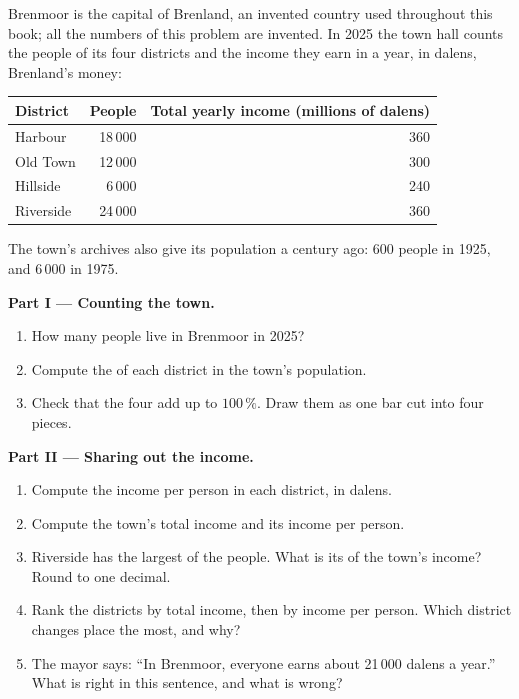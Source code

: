 \begin{problem}
\label{pb:g6:reading-economic-charts:1}
Brenmoor is the capital of Brenland, an invented country used throughout this
book; all the numbers of this problem are invented. In 2025 the town hall
counts the people of its four districts and the income they earn in a year,
in dalens, Brenland's money:

\begin{center}
\begin{tabular}{lrr}
\toprule
District & People & Total yearly income (millions of dalens) \\
\midrule
Harbour   & 18\,000 & 360 \\
Old Town  & 12\,000 & 300 \\
Hillside  &  6\,000 & 240 \\
Riverside & 24\,000 & 360 \\
\bottomrule
\end{tabular}
\end{center}

\noindent The town's archives also give its population a century ago: 600
people in 1925, and 6\,000 in 1975.

\medskip
\noindent\textbf{Part I --- Counting the town.}
\begin{enumerate}
  \item How many people live in Brenmoor in 2025?
  \item Compute the  of each district in the town's population.
  \item Check that the four  add up to $100\,\%$. Draw them as one bar
        cut into four pieces.
\end{enumerate}

\medskip
\noindent\textbf{Part II --- Sharing out the income.}
\begin{enumerate}[resume]
  \item Compute the income per person in each district, in dalens.
  \item Compute the town's total income and its income per person.
  \item Riverside has the largest  of the people. What is its  of
        the town's income? Round to one decimal.
  \item Rank the districts by total income, then by income per person. Which
        district changes place the most, and why?
  \item The mayor says: ``In Brenmoor, everyone earns about 21\,000 dalens a
        year.'' What is right in this sentence, and what is wrong?
\end{enumerate}


\end{problem}

